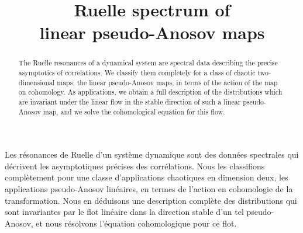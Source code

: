 \documentclass[JEP,XML,SOM,Unicode]{cedram}
\theoremstyle{definition}
\numberwithin{equation}{section}
\begin{document}
\title[Ruelle spectrum of linear pseudo-Anosov maps]{Ruelle spectrum of\\ linear pseudo-Anosov maps}

\author[\initial{F.} \lastname{Faure}]{ }
\address{Univ.\ Grenoble Alpes, CNRS UMR 5582, Institut Fourier\\
F-38000 Grenoble, France}

\author[\initial{S.} \lastname{Gouëzel}]{ }
\address{Laboratoire Jean Leray, CNRS UMR 6629, Université de Nantes\\
2 rue de la Houssinière, 44322 Nantes, France}

\author[\initial{E.} \lastname{Lanneau}]{ }
\address{Univ.\ Grenoble Alpes, CNRS UMR 5582, Institut Fourier\\
F-38000 Grenoble, France}

\begin{abstract}
The Ruelle resonances of a dynamical system are spectral data describing the precise asymptotics of correlations. We classify them completely for a class of chaotic two-dimensional maps, the linear pseudo-Anosov maps, in terms of the action of the map on cohomology. As applications, we obtain a full description of the distributions which are invariant under the linear flow in the stable direction of such a linear pseudo-Anosov map, and we solve the cohomological equation for this flow.
\end{abstract}





\begin{altabstract}
Les résonances de Ruelle d'un système dynamique sont des données spectrales qui décrivent les asymptotiques précises des corrélations. Nous les classifions complètement pour une classe d'applications chaotiques en dimension deux, les applications pseudo-Anosov linéaires, en termes de l'action en cohomologie de la transformation. Nous en déduisons une description complète des distributions qui sont invariantes par le flot linéaire dans la direction stable d'un tel pseudo-Anosov, et nous résolvons l'équation cohomologique pour ce flot.
\end{altabstract}
\end{document}
